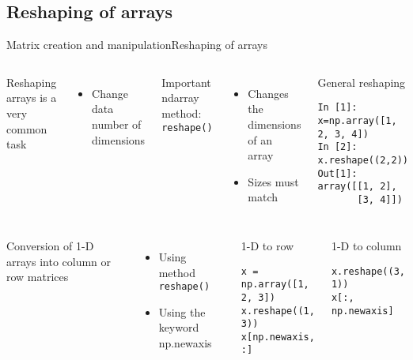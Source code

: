 \documentclass[10pt,compress]{beamer} %
\begin{document}
\subsection{Reshaping of arrays}
\begin{frame}[fragile]{Matrix creation and manipulation}{Reshaping of arrays}
	\begin{columns}
		Reshaping arrays is a very common task
		\begin{itemize}
			\item Change data number of dimensions
		\end{itemize}
		Important ndarray method: \texttt{reshape()}
		\begin{itemize}
			\item Changes the dimensions of an array
			\item Sizes must match
		\end{itemize}

		\begin{exampleblock}{\footnotesize{General reshaping}}
		\vspace{-0.2cm} 
			\begin{lstlisting}
In [1]: x=np.array([1, 2, 3, 4])
In [2]: x.reshape((2,2))
Out[1]: 
array([[1, 2],
       [3, 4]])
			\end{lstlisting}
		\vspace{-0.2cm} 
		\end{exampleblock}
	\end{columns}

	\begin{columns}
	   \column{0.5\textwidth}
		Conversion of 1-D arrays into column or row matrices
		\begin{itemize}
			\item Using method \texttt{reshape()}
			\item Using the keyword \alert{np.newaxis}
		\end{itemize}

 	   \column{0.5\textwidth}
		\begin{exampleblock}{\footnotesize{1-D to row}}
		\vspace{-0.2cm} 
			\begin{lstlisting}
x = np.array([1, 2, 3])
x.reshape((1, 3))
x[np.newaxis, :]
			\end{lstlisting}
		\vspace{-0.2cm} 
		\end{exampleblock}

		\begin{exampleblock}{\footnotesize{1-D to column}}
		\vspace{-0.2cm} 
			\begin{lstlisting}
x.reshape((3, 1))
x[:, np.newaxis]
			\end{lstlisting}
		\vspace{-0.2cm} 
		\end{exampleblock}
	\end{columns}
\end{frame}
\end{document}
